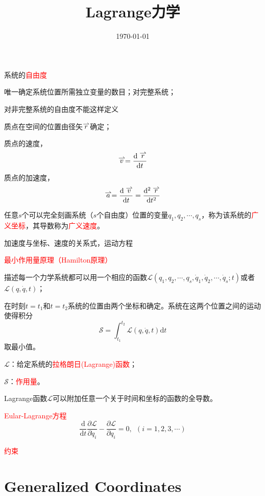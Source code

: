 \documentclass[11pt,a4paper]{article}
\title{Lagrange力学}
\author{}
\date{\today}
\newcommand{\myvec}[1]%
   {\stackrel{\raisebox{-2pt}[0pt][0pt]{\small$\rightharpoonup$}}{#1}}  %
\newcommand{\dif}{\mathrm{d}}
\begin{document}
\maketitle


系统的\textcolor{red}{自由度}

唯一确定系统位置所需独立变量的数目；对完整系统；

对非完整系统的自由度不能这样定义

质点在空间的位置由径矢$\myvec{r}$确定；

质点的速度，
\begin{equation}
\myvec{v} = \frac{\dif \myvec{r}}{\dif t}
\end{equation}
质点的加速度，
\begin{equation}
\myvec{a} = \frac{\dif \myvec{v}}{\dif t} = \frac{\dif^2 \myvec{r}}{\dif t^2}
\end{equation}

任意$s$个可以完全刻画系统（$s$个自由度）位置的变量$q_1, q_2, \cdots, q_s$，称为该系统的\textcolor{red}{广义坐标}，其导数称为\textcolor{red}{广义速度}。

加速度与坐标、速度的关系式，运动方程

\textcolor{red}{最小作用量原理（Hamilton原理）}

描述每一个力学系统都可以用一个相应的函数$\mathscr{L}(q_1, q_2, \cdots, q_s, \dot{q}_1, \dot{q}_2, \cdots, \dot{q}_s; t)$或者$\mathscr{L}(q, \dot{q}, t)$；

在时刻$t=t_1$和$t=t_2$系统的位置由两个坐标和确定。系统在这两个位置之间的运动使得积分
\begin{equation}
\mathcal{S} = \int_{t_1}^{t_2} \mathscr{L}(q, \dot{q}, t) \dif t
\end{equation}
取最小值。

$\mathscr{L}$：给定系统的\textcolor{red}{拉格朗日(Lagrange)函数}；

$\mathcal{S}$：\textcolor{red}{作用量}。

Lagrange函数$\mathscr{L}$可以附加任意一个关于时间和坐标的函数的全导数。

\textcolor{red}{Eular-Lagrange方程}
\begin{equation}
\frac{\dif }{\dif t} \frac{\partial \mathscr{L}}{\partial \dot{q}_i} -\frac{\partial \mathscr{L}}{\partial q_i} = 0, ~~ (i = 1, 2, 3, \cdots)
\end{equation}


\textcolor{red}{约束}


\section{Generalized Coordinates}
\end{document}
